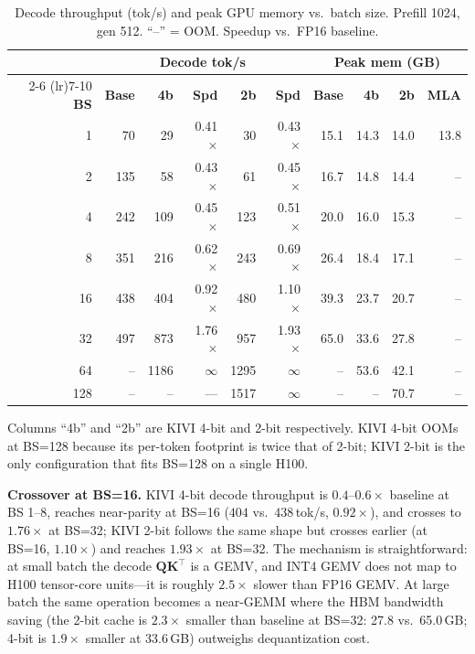 \documentclass[conference]{IEEEtran}
\begin{document}
\begin{table}[!t]
\centering
\caption{Decode throughput (tok/s) and peak GPU memory vs.\ batch size.
Prefill 1024, gen 512.  ``--'' = OOM. Speedup vs.\ FP16 baseline.}
\label{tab:throughput}
\setlength{\tabcolsep}{2.5pt}
\footnotesize
\begin{tabular}{@{}rrrrrrrrrr@{}}
\toprule
 & \multicolumn{5}{c}{\textbf{Decode tok/s}} & \multicolumn{4}{c}{\textbf{Peak mem (GB)}} \\
\cmidrule(lr){2-6} \cmidrule(lr){7-10}
\textbf{BS} & \textbf{Base} & \textbf{4b} & \textbf{Spd} & \textbf{2b} & \textbf{Spd} & \textbf{Base} & \textbf{4b} & \textbf{2b} & \textbf{MLA} \\
\midrule
1   &  70 &   29 & 0.41$\times$ &   30 & 0.43$\times$ & 15.1 & 14.3 & 14.0 & 13.8 \\
2   & 135 &   58 & 0.43$\times$ &   61 & 0.45$\times$ & 16.7 & 14.8 & 14.4 &  --   \\
4   & 242 &  109 & 0.45$\times$ &  123 & 0.51$\times$ & 20.0 & 16.0 & 15.3 &  --   \\
8   & 351 &  216 & 0.62$\times$ &  243 & 0.69$\times$ & 26.4 & 18.4 & 17.1 &  --   \\
16  & 438 &  404 & 0.92$\times$ &  480 & 1.10$\times$ & 39.3 & 23.7 & 20.7 &  --   \\
32  & 497 &  873 & 1.76$\times$ &  957 & 1.93$\times$ & 65.0 & 33.6 & 27.8 &  --   \\
64  &  -- & 1186 & $\infty$     & 1295 & $\infty$     &  --  & 53.6 & 42.1 &  --   \\
128 &  -- &  --  & ---          & 1517 & $\infty$     &  --  &  --  & 70.7 &  --   \\
\bottomrule
\end{tabular}
\vspace{2pt}

\footnotesize{Columns ``4b'' and ``2b'' are KIVI 4-bit and 2-bit
respectively.  KIVI 4-bit OOMs at BS=128 because its per-token
footprint is twice that of 2-bit; KIVI 2-bit is the only configuration
that fits BS=128 on a single H100.}
\end{table}

\textbf{Crossover at BS=16.}  KIVI 4-bit decode throughput is
$0.4$--$0.6\times$ baseline at BS 1--8, reaches near-parity at BS=16
($404$ vs.\ $438$\,tok/s, $0.92\times$), and crosses to $1.76\times$
at BS=32; KIVI 2-bit follows the same shape but crosses earlier (at
BS=16, $1.10\times$) and reaches $1.93\times$ at BS=32.  The mechanism
is straightforward: at small batch the decode
$\mathbf{Q}\mathbf{K}^\top$ is a GEMV, and INT4 GEMV does not map to
H100 tensor-core units---it is roughly $2.5\times$ slower than FP16
GEMV.  At large batch the same operation becomes a near-GEMM where the
HBM bandwidth saving (the 2-bit cache is $2.3\times$ smaller than
baseline at BS=32: 27.8 vs.\ 65.0\,GB; 4-bit is $1.9\times$ smaller at
33.6\,GB) outweighs dequantization cost.
\end{document}
